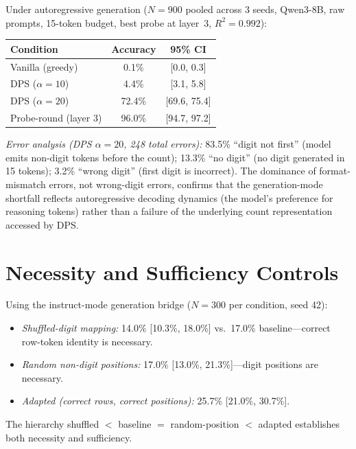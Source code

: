 \documentclass{article}
\begin{document}
Under autoregressive generation ($N{=}900$ pooled across 3 seeds,
Qwen3-8B, raw prompts, 15-token budget, best probe at layer~3, $R^2{=}0.992$):

\begin{center}
\begin{tabular}{lcc}
\toprule
\textbf{Condition} & \textbf{Accuracy} & \textbf{95\% CI} \\
\midrule
Vanilla (greedy) & 0.1\% & [0.0, 0.3] \\
DPS ($\alpha{=}10$) & 4.4\% & [3.1, 5.8] \\
DPS ($\alpha{=}20$) & 72.4\% & [69.6, 75.4] \\
Probe-round (layer 3) & 96.0\% & [94.7, 97.2] \\
\bottomrule
\end{tabular}
\end{center}

\noindent\emph{Error analysis (DPS $\alpha{=}20$, 248 total errors):}
83.5\% ``digit not first'' (model emits non-digit tokens before the count);
13.3\% ``no digit'' (no digit generated in 15 tokens);
3.2\% ``wrong digit'' (first digit is incorrect).
The dominance of format-mismatch errors, not wrong-digit errors, confirms that
the generation-mode shortfall reflects autoregressive decoding dynamics
(the model's preference for reasoning tokens) rather than a failure of the
underlying count representation accessed by DPS.

\section{Necessity and Sufficiency Controls}
\label{sec:necessity_sufficiency}

Using the instruct-mode generation bridge ($N = 300$ per condition, seed 42):
\begin{itemize}
  \item \emph{Shuffled-digit mapping:} 14.0\% [10.3\%, 18.0\%] vs.\ 17.0\% baseline---correct row-token identity is necessary.
  \item \emph{Random non-digit positions:} 17.0\% [13.0\%, 21.3\%]---digit positions are necessary.
  \item \emph{Adapted (correct rows, correct positions):} 25.7\% [21.0\%, 30.7\%].
\end{itemize}
The hierarchy shuffled $<$ baseline $=$ random-position $<$ adapted
establishes both necessity and sufficiency.
\end{document}

